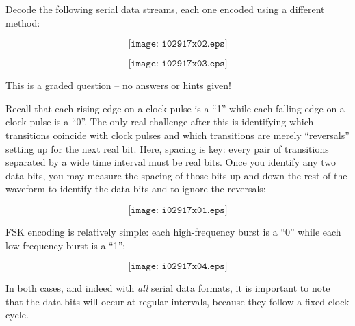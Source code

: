 

Decode the following serial data streams, each one encoded using a different method:

$$\texttt{[image: i02917x02.eps]}$$

\vskip 30pt

$$\texttt{[image: i02917x03.eps]}$$

\vfil 

\eject






This is a graded question -- no answers or hints given!







Recall that each rising edge on a clock pulse is a ``1'' while each falling edge on a clock pulse is a ``0''.  The only real challenge after this is identifying which transitions coincide with clock pulses and which transitions are merely ``reversals'' setting up for the next real bit.  Here, spacing is key: every pair of transitions separated by a wide time interval must be real bits.  Once you identify any two data bits, you may measure the spacing of those bits up and down the rest of the waveform to identify the data bits and to ignore the reversals:

$$\texttt{[image: i02917x01.eps]}$$

\vskip 10pt

FSK encoding is relatively simple: each high-frequency burst is a ``0'' while each low-frequency burst is a ``1'':

$$\texttt{[image: i02917x04.eps]}$$

In both cases, and indeed with {\it all} serial data formats, it is important to note that the data bits will occur at regular intervals, because they follow a fixed clock cycle.




